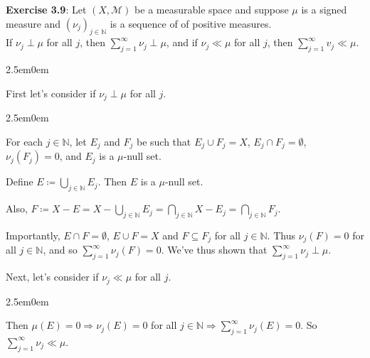 \documentclass{book}
\newcommand{\exTwoP}{%
   \color{RedViolet}%
   \fontsize{13}{15}\selectfont%
}
\newcommand{\exPP}{%
   \color{RedViolet}%
   \fontsize{12}{14}\selectfont%
}
\newenvironment{myIndent}{%
   \begin{adjustwidth}{2.5em}{0em}%
}{%
   \end{adjustwidth}%
}
\newcommand{\blab}[1]{\textbf{#1}}
\newcommand{\retTwo}{\hfill\bigbreak}
\begin{document}
\blab{Exercise 3.9}: Let $(X, \mathcal{M})$ be a measurable space and suppose $\mu$ is a signed measure and $(\nu_j)_{j \in \mathbb{N}}$ is a sequence of of positive measures.\\ [2pt] If $\nu_j \perp \mu$ for all $j$, then $\sum\limits_{j=1}^\infty \nu_j \perp \mu$, and if $\nu_j \ll \mu$ for all $j$, then $\sum\limits_{j=1}^\infty v_j \ll \mu$.\\ [2pt]

\begin{myIndent}\exTwoP
	First let's consider if $\nu_j \perp \mu$ for all $j$.
	
	\begin{myIndent}\exPP
		For each $j \in \mathbb{N}$, let $E_j$ and $F_j$ be such that $E_j \cup F_j = X$,\phantom{a} $E_j \cap F_j = \emptyset$,\\ $\nu_j(F_j) = 0$, and $E_j$ is a $\mu$-null set.\retTwo
	
		Define $E \coloneq \bigcup\limits_{j \in \mathbb{N}} E_j$. Then $E$ is a $\mu$-null set.\retTwo
	
		Also, $F \coloneq X - E = X - \bigcup\limits_{j \in \mathbb{N}} E_j = \bigcap\limits_{j \in \mathbb{N}}X - E_j = \bigcap\limits_{j \in \mathbb{N}} F_j$.\retTwo
	
		Importantly, $E \cap F = \emptyset$, $E \cup F = X$ and $F \subseteq F_j$ for all $j \in \mathbb{N}$. Thus $\nu_j(F) = 0$ for all $j \in \mathbb{N}$, and so $\sum\limits_{j = 1}^\infty \nu_j(F) = 0$. We've thus shown that $\sum\limits_{j = 1}^\infty \nu_j \perp \mu$.\retTwo
	\end{myIndent}

	Next, let's consider if $\nu_j \ll \mu$ for all $j$.
	
	\begin{myIndent}\exPP
		Then $\mu(E) = 0 \Longrightarrow \nu_j(E) = 0$ for all $j \in \mathbb{N} \Longrightarrow \sum\limits_{j=1}^\infty \nu_j(E) = 0$. So $\sum\limits_{j=1}^\infty \nu_j \ll \mu$.\newpage
	\end{myIndent}
\end{myIndent}
\end{document}

